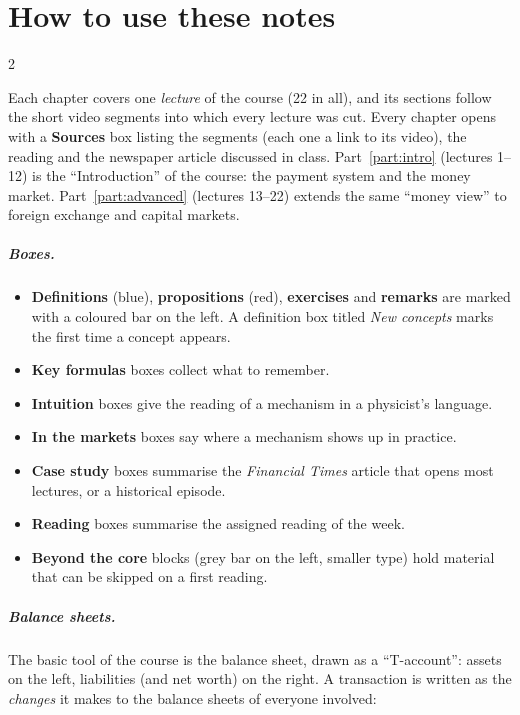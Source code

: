 \documentclass[12pt,oneside,openany]{book}
\begin{document}
\chapter*{How to use these notes}
\begin{paracol}{2}

Each chapter covers one \emph{lecture} of the course (22 in all), and its sections follow the short
video segments into which every lecture was cut. Every chapter opens with a \textbf{Sources} box
listing the segments (each one a link to its video), the reading and the newspaper article
discussed in class. Part~\ref{part:intro} (lectures 1--12) is the ``Introduction'' of the course:
the payment system and the money market. Part~\ref{part:advanced} (lectures 13--22) extends the
same ``money view'' to foreign exchange and capital markets.

\paragraph{Boxes.}
\begin{itemize}
  \item \textcolor{defcol}{\textbf{Definitions}} (blue), \textcolor{thmcol}{\textbf{propositions}} (red),
        \textcolor{exercol}{\textbf{exercises}} and \textcolor{srccol}{\textbf{remarks}} are marked with a
        coloured bar on the left. A definition box titled \emph{New concepts} marks the first time a concept appears.
  \item \textcolor{keycol}{\textbf{Key formulas}} boxes collect what to remember.
  \item \textcolor{intucol}{\textbf{Intuition}} boxes give the reading of a mechanism in a physicist's language.
  \item \textcolor{fincol}{\textbf{In the markets}} boxes say where a mechanism shows up in practice.
  \item \textcolor{cscol}{\textbf{Case study}} boxes summarise the \emph{Financial Times} article that
        opens most lectures, or a historical episode.
  \item \textcolor{srccol}{\textbf{Reading}} boxes summarise the assigned reading of the week.
  \item \textbf{Beyond the core} blocks (grey bar on the left, smaller type) hold material that can be
        skipped on a first reading.
\end{itemize}

\paragraph{Balance sheets.} The basic tool of the course is the balance sheet, drawn as a ``T-account'':
assets on the left, liabilities (and net worth) on the right. A transaction is written as the
\emph{changes} it makes to the balance sheets of everyone involved:
\begin{taccts}
\qquad
{}
\end{taccts}


\end{paracol}
\end{document}
